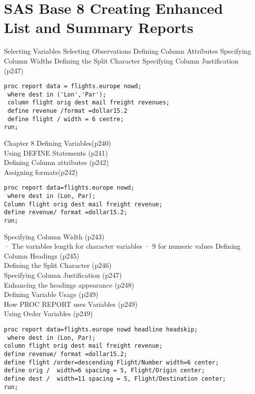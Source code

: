 
\section{SAS Base 8 Creating Enhanced List and Summary Reports}
Selecting Variables
Selecting Observations
Defining Column Attributes
Specifying Column Widths
Defining the Split Character
Specifying Column Justification
(p247)

\begin{framed}
\begin{verbatim}
proc report data = flights.europe nowd;
 where dest in ('Lon','Par');
 column flight orig dest mail freight revenues;
 define revenue /format =dollar15.2
 define flight / width = 6 centre;
run;
\end{verbatim}
\end{framed}




Chapter 8
Defining Variables(p240)\\
Using DEFINE Statements (p241)\\
Defining Column attributes (p242)\\
Assigning formats(p242)\\
\begin{framed}
\begin{verbatim}
proc report data=flights.europe nowd;
 where dest in (Lon, Par);
Column flight orig dest mail freight revenue;
define revenue/ format =dollar15.2;
run;
\end{verbatim}
\end{framed}

Specifying Column Width (p243)\\
·         The variables length for character variables
·         9 for numeric values
Defining Column Headings (p245)\\
Defining the Split Character (p246)\\
Specifying Column Justification (p247)\\
Enhancing the headings appearance (p248)\\
Defining Variable Usage (p249)\\
How PROC REPORT uses Variables (p249)\\
Using Order Variables (p249)\\
\begin{framed}
\begin{verbatim}
proc report data=flights.europe nowd headline headskip;
 where dest in (Lon, Par);
column flight orig dest mail freight revenue;
define revenue/ format =dollar15.2;
define flight /order=descending Flight/Number width=6 center;
define orig /  width=6 spacing = 5, Flight/Origin center;
define dest /  width=11 spacing = 5, Flight/Destination center;
run;
\end{verbatim}
\end{framed}


